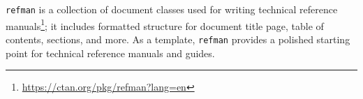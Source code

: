 \begin{minipage}{\linewidth}
\end{minipage}

\texttt{refman} is a collection of document classes used for writing technical reference manuals\footnote{\url{https://ctan.org/pkg/refman?lang=en}}; it includes formatted structure for document title page, table of contents, sections, and more. As a template, \texttt{refman} provides a polished starting point for technical reference manuals and guides.

\begin{minipage}{\linewidth}
\end{minipage}



